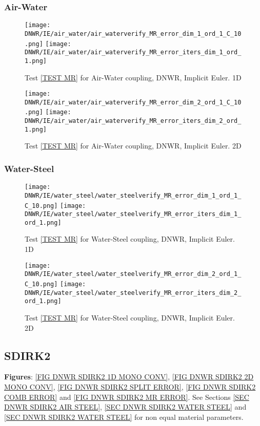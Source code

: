 \documentclass[a4paper,10pt]{article}
\begin{document}
\FloatBarrier
\subsubsection{Air-Water}\label{SEC DNWR IE AIR WATER}
% 

\begin{figure}[!ht]
\texttt{[image: DNWR/IE/air\_water/air\_waterverify\_MR\_error\_dim\_1\_ord\_1\_C\_10.png]}
\texttt{[image: DNWR/IE/air\_water/air\_waterverify\_MR\_error\_iters\_dim\_1\_ord\_1.png]}
\caption{Test \ref{TEST MR} for Air-Water coupling, DNWR, Implicit Euler. 1D}
\label{FIG DNWR IE AIR WATER 1D}
\end{figure}

\begin{figure}[!ht]
\texttt{[image: DNWR/IE/air\_water/air\_waterverify\_MR\_error\_dim\_2\_ord\_1\_C\_10.png]}
\texttt{[image: DNWR/IE/air\_water/air\_waterverify\_MR\_error\_iters\_dim\_2\_ord\_1.png]}
\caption{Test \ref{TEST MR} for Air-Water coupling, DNWR, Implicit Euler. 2D}
\label{FIG DNWR IE AIR WATER 2D}
\end{figure}

\FloatBarrier
\subsubsection{Water-Steel}\label{SEC DNWR IE WATER STEEL}
% 

\begin{figure}[!ht]
\texttt{[image: DNWR/IE/water\_steel/water\_steelverify\_MR\_error\_dim\_1\_ord\_1\_C\_10.png]}
\texttt{[image: DNWR/IE/water\_steel/water\_steelverify\_MR\_error\_iters\_dim\_1\_ord\_1.png]}
\caption{Test \ref{TEST MR} for Water-Steel coupling, DNWR, Implicit Euler. 1D}
\label{FIG DNWR IE WATER STEEL 1D}
\end{figure}

\begin{figure}[!ht]
\texttt{[image: DNWR/IE/water\_steel/water\_steelverify\_MR\_error\_dim\_2\_ord\_1\_C\_10.png]}
\texttt{[image: DNWR/IE/water\_steel/water\_steelverify\_MR\_error\_iters\_dim\_2\_ord\_1.png]}
\caption{Test \ref{TEST MR} for Water-Steel coupling, DNWR, Implicit Euler. 2D}
\label{FIG DNWR IE WATER STEEL 2D}
\end{figure}

\FloatBarrier
\subsection{SDIRK2}\label{SEC DWNR SDIRK2}
% 
\textbf{Figures}: \ref{FIG DNWR SDIRK2 1D MONO CONV}, \ref{FIG DNWR SDIRK2 2D MONO CONV}, \ref{FIG DNWR SDIRK2 SPLIT ERROR}, \ref{FIG DNWR SDIRK2 COMB ERROR} and \ref{FIG DNWR SDIRK2 MR ERROR}. See Sections \ref{SEC DNWR SDIRK2 AIR STEEL}, \ref{SEC DNWR SDIRK2 WATER STEEL} and \ref{SEC DNWR SDIRK2 WATER STEEL} for non equal material parameters.
\end{document}

